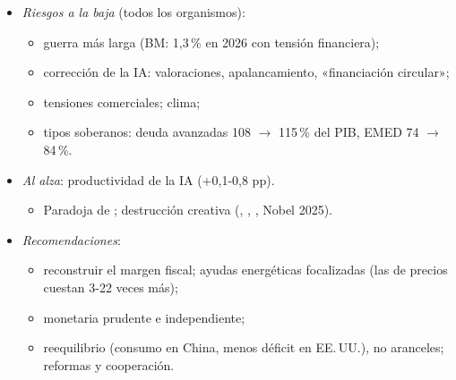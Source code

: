\documentclass{article}
\begin{document}
\begin{columnas}
\begin{itemize}
\item \emph{Riesgos a la baja} (todos los organismos):
  \begin{itemize}
  \item guerra más larga (BM: 1,3\,\% en 2026 con tensión financiera);
  \item corrección de la IA: valoraciones, apalancamiento, «financiación circular»;
  \item tensiones comerciales; clima;
  \item tipos soberanos: deuda avanzadas 108 $\to$ 115\,\% del PIB, EMED 74 $\to$ 84\,\%.
  \end{itemize}
\item \emph{Al alza}: productividad de la IA (+0,1-0,8 pp).
  \begin{itemize}
  \item Paradoja de ; destrucción creativa (, , , Nobel 2025).
  \end{itemize}
\item \emph{Recomendaciones}:
  \begin{itemize}
  \item reconstruir el margen fiscal; ayudas energéticas focalizadas (las de precios cuestan 3-22 veces más);
  \item monetaria prudente e independiente;
  \item reequilibrio (consumo en China, menos déficit en EE.\,UU.), no aranceles; reformas y cooperación.
  \end{itemize}
\end{itemize}


\end{columnas}
\end{document}
